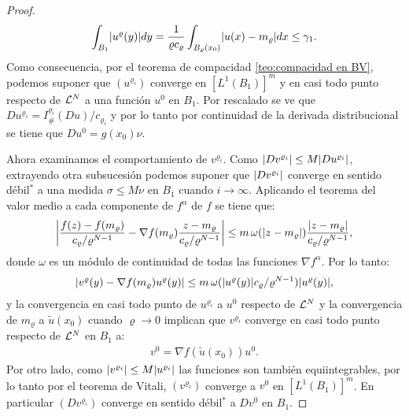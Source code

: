 \documentclass[a4paper,11pt,spanish, twoside, leqno]{tfm-uam}
\begin{document}
\begin{proof}
\begin{align*}
\int_{B_1}\abs{u^{\varrho}(y)}dy=\dfrac{1}{\varrho c_{\varrho}}\int_{B_{\varrho}(x_0)}\abs{u(x)-m_{\varrho}}dx\leq \gamma_{1}.
\end{align*}
Como consecuencia, por el teorema de compacidad 	\ref{teo:compacidad en BV}, podemos suponer que $(u^{\varrho_{i}})$ converge en $[L^{1}(B_1)]^{m}$ y en casi todo punto respecto de $\Lm{N}$ a una función $u^{0}$ en $B_1$. Por rescalado se ve que $Du^{\varrho_{i}}=I_{\#}^{\varrho_{i}}(Du)/c_{\varrho_{i}}$ y por lo tanto por continuidad de la derivada distribucional se tiene que $Du^{0}=g(x_{0})\nu$. 

Ahora examinamos el comportamiento de $v^{\varrho_{i}}$. Como $\abs{Dv^{\varrho_i}}\leq M\abs{Du^{\varrho_i}}$, extrayendo otra subsucesión podemos suponer que $\abs{Dv^{\varrho_i}}$ converge en sentido débil$^{*}$ a una medida $\sigma\leq M \nu$ en $B_1$ cuando $i\to \infty$. Aplicando el teorema del valor medio a cada componente de $f^{\alpha}$ de $f$ se tiene que:
\begin{align*}
\abs*{\dfrac{f(z)-f(m_{\varrho})}{c_{\varrho}/\varrho^{N-1}}-\nabla{f(m_{\varrho})}\dfrac{z-m_{\varrho}}{c_{\varrho}/\varrho^{N-1}}}\leq m \,\omega(\abs{z-m_{\varrho}})\dfrac{\abs{z-m_{\varrho}}}{c_{\varrho}/\varrho^{N-1}},
\end{align*} 
donde $\omega$ es un módulo de continuidad de todas las funciones $\nabla f^{\alpha}$. Por lo tanto:
\begin{align*}
\abs*{v^{\varrho}(y)-\nabla{f(m_{\varrho})u^{\varrho}(y)}}\leq m\, \omega( \abs{u^{\varrho}(y)}c_{\varrho}/\varrho^{N-1} ) \abs{u^{\varrho}(y)},
\end{align*}
y la convergencia en casi todo punto de $u^{\varrho_{i}}$ a $u^{0}$ respecto de $\Lm{N}$ y la convergencia de $m_{\varrho}$ a $\tilde{u}(x_{0})$ cuando $\varrho\to 0$ implican que $v^{\varrho_{i}}$ converge en casi todo punto respecto de $\Lm{N}$ en $B_1$ a:
\begin{align}\label{proof:Regla de la cadena en BV version 1}
v^{0}=\nabla{f(\tilde{u}(x_{0}))}u^{0}.
\end{align}
Por otro lado, como $\abs*{v^{\varrho_{i}}}\leq M\abs*{u^{\varrho_{i}}}$ las funciones son también equiintegrables, por lo tanto por el teorema de Vitali, $(v^{\varrho_i})$ converge a $v^{0}$ en $[L^{1}(B_1)]^{m}$. En particular $(Dv^{\varrho_{i}})$ converge en sentido débil$^{*}$ a $Dv^{0}$ en $B_1$.


\end{proof}
\end{document}

